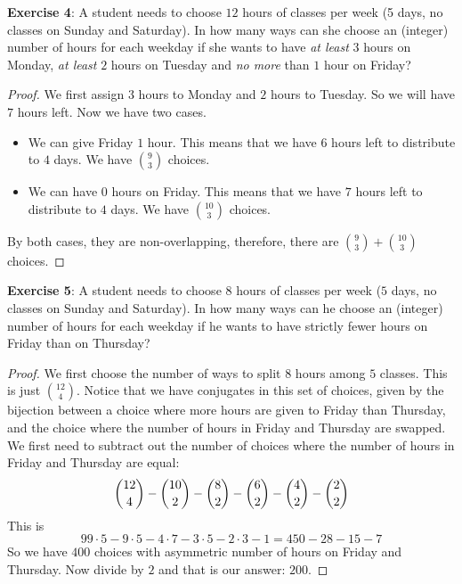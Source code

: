 \documentclass{article}
\begin{document}
\textbf{Exercise 4}: A student needs to choose $12$ hours of classes per week (5 days, no classes on Sunday and Saturday). In how many ways can she choose an (integer) number of hours for each weekday if she wants to have \textit{at least} $3$ hours on Monday, \textit{at least} $2$ hours on Tuesday and \textit{no more} than $1$ hour on Friday?
    \begin{proof}
        We first assign $3$ hours to Monday and $2$ hours to Tuesday. So we will have $7$ hours left. Now we have two cases.
            \begin{itemize}
                \item We can give Friday $1$ hour. This means that we have $6$ hours left to  distribute to $4$ days. We have $\binom{9}{3}$ choices.

                \item We can have $0$ hours on Friday. This means that we have $7$ hours left to distribute to $4$ days. We have $\binom{10}{3}$ choices.
            \end{itemize}
        By both cases, they are non-overlapping, therefore, there are $\binom{9}{3} + \binom{10}{3}$ choices.
    \end{proof}

\textbf{Exercise 5}: A student needs to choose $8$ hours of classes per week ($5$ days, no classes on Sunday and Saturday). In how many ways can he choose an (integer) number of hours for each weekday if he wants to have strictly fewer hours on Friday than on Thursday?
    \begin{proof}
        We first choose the number of ways to split $8$ hours among $5$ classes. This is just $\binom{12}{4}$. Notice that we have conjugates in this set of choices, given by the bijection between a choice where more hours are given to Friday than Thursday, and the choice where the number of hours in Friday and Thursday are swapped. We first need to subtract out the number of choices where the number of hours in Friday and Thursday are equal:
            \begin{equation*}
                \dbinom{12}{4} - \dbinom{10}{2} - \dbinom{8}{2} - \dbinom{6}{2} - \dbinom{4}{2} - \dbinom{2}{2}
            \end{equation*}
        This is 
            \begin{equation*}
                99 \cdot 5 - 9 \cdot 5 - 4 \cdot 7 - 3 \cdot 5 - 2 \cdot 3 - 1 = 450 - 28 - 15 - 7
            \end{equation*}
        So we have $400$ choices with asymmetric number of hours on Friday and Thursday. Now divide by $2$ and that is our answer: $200$.
    \end{proof}
\end{document}
